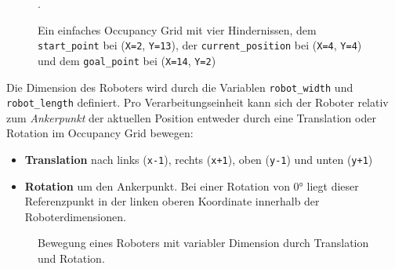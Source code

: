 \begin{figure}[H]
\begin{minipage}{0.35\textwidth}
	\end{minipage}
	\hspace*{\fill}
	\caption{Ein einfaches Occupancy Grid mit vier Hindernissen, dem \texttt{start\_point} bei (\texttt{X=2}, \texttt{Y=13}), der \texttt{current\_position} bei (\texttt{X=4}, \texttt{Y=4}) und dem \texttt{goal\_point} bei (\texttt{X=14}, \texttt{Y=2})}.
\end{figure}

\vspace*{-0.5cm}
Die Dimension des Roboters wird durch die Variablen \texttt{robot\_width} und \texttt{robot\_length} definiert. Pro Verarbeitungseinheit kann sich der Roboter relativ zum \textit{Ankerpunkt} der aktuellen Position entweder durch eine Translation oder Rotation im Occupancy Grid bewegen:
\begin{itemize}
\item \textbf{Translation} nach links (\texttt{x-1}), rechts (\texttt{x+1}), oben (\texttt{y-1}) und unten (\texttt{y+1})
\item \textbf{Rotation} um den Ankerpunkt. Bei einer Rotation von $0$° liegt dieser Referenzpunkt in der linken oberen Koordinate innerhalb der Roboterdimensionen.
\end{itemize}
\begin{figure}[H]
	\centering
	\footnotesize
	\centerline{\resizebox{1\linewidth}{!}{}}
	\caption{Bewegung eines Roboters mit variabler Dimension durch Translation und Rotation.}
\end{figure}

